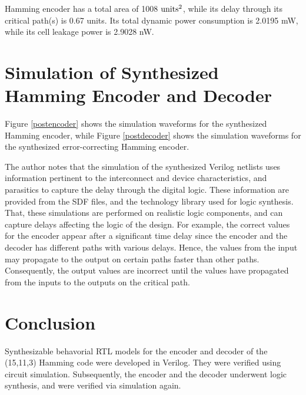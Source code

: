 \documentclass[ee577b,acmnow]{acmtrans2m}
\begin{document}
Hamming encoder has a total area of 1008 ${\rm units^2}$, while
its delay through its critical path(s) is 0.67 units. Its total
dynamic power consumption is 2.0195 mW, while its cell leakage
power is 2.9028 nW.

\section{Simulation of Synthesized Hamming Encoder and Decoder}

Figure \ref{postencoder} shows the simulation waveforms for the
synthesized Hamming encoder, while Figure \ref{postdecoder} shows
the simulation waveforms for the synthesized error-correcting
Hamming encoder.

The author notes that the simulation of the synthesized Verilog
netlists uses information pertinent to the interconnect
and device characteristics, and parasitics to capture the delay
through the digital logic. These information are provided from
the SDF files, and the technology library used for logic
synthesis. That, these simulations are performed on realistic
logic components, and can capture delays affecting the logic
of the design. For example, the correct values for the encoder
appear after a significant time delay since the encoder and the
decoder has different paths with various delays. Hence, the
values from the input may propagate to the output on certain
paths faster than other paths. Consequently, the output values
are incorrect until the values have propagated from the inputs
to the outputs on the critical path.

\section{Conclusion}

Synthesizable behavorial RTL models for the encoder and decoder
of the (15,11,3) Hamming code were developed in Verilog. They
were verified using circuit simulation. Subsequently, the
encoder and the decoder underwent logic synthesis, and were
verified via simulation again.
\end{document}

